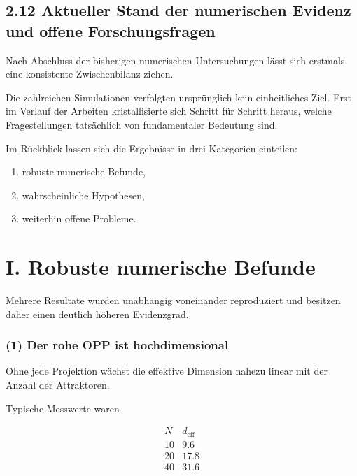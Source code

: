 \subsection{2.12 Aktueller Stand der numerischen Evidenz und offene Forschungsfragen}

Nach Abschluss der bisherigen numerischen Untersuchungen lässt sich erstmals eine konsistente Zwischenbilanz ziehen.

Die zahlreichen Simulationen verfolgten ursprünglich kein einheitliches Ziel. Erst im Verlauf der Arbeiten kristallisierte sich Schritt für Schritt heraus, welche Fragestellungen tatsächlich von fundamentaler Bedeutung sind.

Im Rückblick lassen sich die Ergebnisse in drei Kategorien einteilen:

\begin{enumerate}
\item robuste numerische Befunde,
\item wahrscheinliche Hypothesen,
\item weiterhin offene Probleme.
\end{enumerate}


\section*{I. Robuste numerische Befunde}

Mehrere Resultate wurden unabhängig voneinander reproduziert und besitzen daher einen deutlich höheren Evidenzgrad.


\subsubsection*{(1) Der rohe OPP ist hochdimensional}

Ohne jede Projektion wächst die effektive Dimension nahezu linear mit der Anzahl der Attraktoren.

Typische Messwerte waren

\[
\begin{array}{c|c}
N & d_{\mathrm{eff}} \\
\hline
10 & 9.6 \\
20 & 17.8 \\
40 & 31.6
\end{array}
\]

